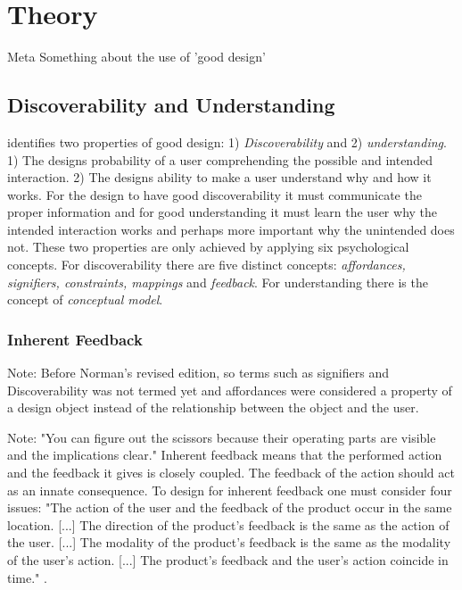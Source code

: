 \chapter{Theory}

Meta
Something about the use of 'good design'

\section{Discoverability and Understanding}
 identifies two properties of good design: 1) \textit{Discoverability} and 2) \textit{understanding}. 1) The designs probability of a user comprehending the possible and intended interaction. 2) The designs ability to make a user understand why and how it works. For the design to have good discoverability it must communicate the proper information and for good understanding it must learn the user why the intended interaction works and perhaps more important why the unintended does not. These two properties are only achieved by applying six psychological concepts. For discoverability there are five distinct concepts: \textit{affordances, signifiers, constraints, mappings} and \textit{feedback}. For understanding there is the concept of \textit{conceptual model}.
\cite{norman} \cite{fullerton}

\subsection{Inherent Feedback}
Note: Before Norman's revised edition, so terms such as signifiers and Discoverability was not termed yet and affordances were considered a property of a design object instead of the relationship between the object and the user.


Note: "You can figure out the scissors because their operating parts are
visible and the implications clear." \cite{norman}
Inherent feedback means that the performed action and the feedback it gives is closely coupled. The feedback of the action should act as an innate consequence. To design for inherent feedback one must consider four issues: "The action of the user and the feedback of the product occur in the
same location. [...] The direction of the product's feedback is the same as the action of
the user. [...] The modality of the product's feedback is the same as the modality
of the user's action. [...] The product's feedback and the user's action coincide in time." \cite{howdonald}.

\cite{frogger}
